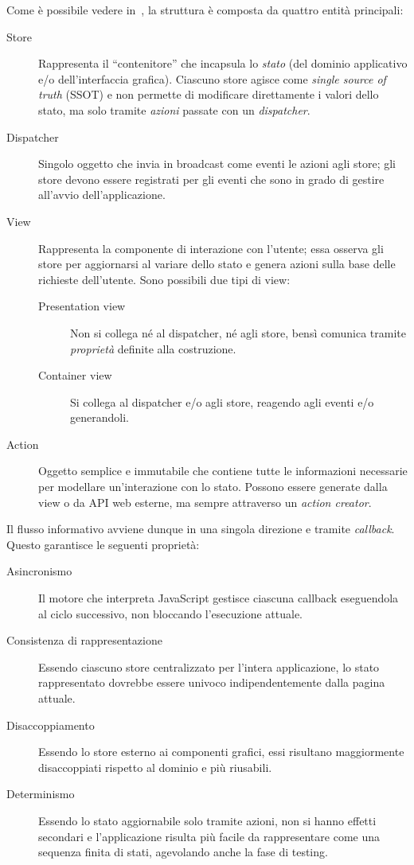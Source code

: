 Come è possibile vedere in~, la struttura è composta da quattro entità principali:
\begin{description}
  \item[Store]
    Rappresenta il ``contenitore'' che incapsula lo \emph{stato} (del dominio applicativo e/o dell'interfaccia grafica).
    Ciascuno store agisce come \emph{single source of truth} (SSOT)
    e non permette di modificare direttamente i valori dello stato, ma solo tramite \emph{azioni} passate con un \emph{dispatcher}.
  \item[Dispatcher]
    Singolo oggetto che invia in broadcast come eventi le azioni agli store;
    gli store devono essere registrati per gli eventi che sono in grado di gestire all'avvio dell'applicazione.
  \item[View]
    Rappresenta la componente di interazione con l'utente;
    essa osserva gli store per aggiornarsi al variare dello stato e genera azioni sulla base delle richieste dell'utente.
    Sono possibili due tipi di view:
    \begin{description}
      \item[Presentation view] Non si collega né al dispatcher, né agli store, bensì comunica tramite \emph{proprietà} definite alla costruzione.
      \item[Container view] Si collega al dispatcher e/o agli store, reagendo agli eventi e/o generandoli.
    \end{description}
  \item[Action]
    Oggetto semplice e immutabile che contiene tutte le informazioni necessarie per modellare un'interazione con lo stato.
    Possono essere generate dalla view o da API web esterne, ma sempre attraverso un \emph{action creator}.
\end{description}

Il flusso informativo avviene dunque in una singola direzione e tramite \emph{callback}.
Questo garantisce le seguenti proprietà:

\begin{description}
  \item[Asincronismo]
    Il motore che interpreta JavaScript gestisce ciascuna callback eseguendola al ciclo successivo, non bloccando l'esecuzione attuale.
  \item[Consistenza di rappresentazione]
    Essendo ciascuno store centralizzato per l'intera applicazione, lo stato rappresentato dovrebbe essere univoco indipendentemente dalla pagina attuale.
  \item[Disaccoppiamento]
    Essendo lo store esterno ai componenti grafici, essi risultano maggiormente disaccoppiati rispetto al dominio e più riusabili.
  \item[Determinismo]
    Essendo lo stato aggiornabile solo tramite azioni, non si hanno effetti secondari e l'applicazione risulta più facile da rappresentare come una sequenza finita di stati, agevolando anche la fase di testing.
\end{description}

